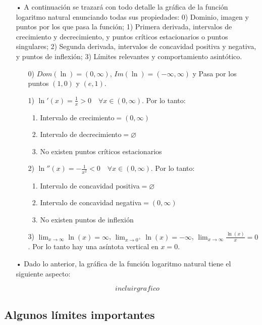 \documentclass[pts12]{article}
\numberwithin{equation}{section}
\newcommand{\Col}{\color{ProcessBlue}}
\begin{document}
\begin{itemize}

\item[\Col •] A continuación se trazará con todo detalle la gráfica de la función logaritmo natural enunciando todas sus propiedades: 0) Dominio, imagen y puntos por los que pasa la función; 1) Primera derivada, intervalos de crecimiento y decrecimiento, y puntos críticos estacionarios o puntos singulares; 2) Segunda derivada, intervalos de concavidad positiva y negativa, y puntos de inflexión; 3) Límites relevantes y comportamiento asintótico. 

\begin{enumerate}
\item[0)] $Dom(\ln)=(0,\infty)$, $Im(\ln)=(-\infty,\infty)$ y Pasa por los puntos $(1,0)$ y $(e,1)$.
\item[1)] $\ln'(x)=\frac{1}{x}>0 \quad \forall x\in (0,\infty)$. Por lo tanto:
\begin{enumerate}
\item Intervalo de crecimiento$=(0,\infty)$
\item Intervalo de decrecimiento$=\varnothing$
\item No existen puntos críticos estacionarios
\end{enumerate} 
\item[2)] $\ln''(x)=-\frac{1}{x^2}<0 \quad \forall x\in (0,\infty)$. Por lo tanto:
\begin{enumerate}
\item Intervalo de concavidad positiva$=\varnothing$
\item Intervalo de concavidad negativa$=(0,\infty)$
\item No existen puntos de inflexión
\end{enumerate}
\item[3)] $\lim_{x\to\infty}\ln(x)=\infty$, $\lim_{x\to 0^+}\ln(x)=-\infty$, $\lim_{x\to\infty}\frac{\ln(x)}{x}=0$. Por lo tanto hay una asíntota vertical en $x=0$.
\end{enumerate}

\item[\Col •] Dado lo anterior, la gráfica de la función logaritmo natural tiene el siguiente aspecto:

$$ incluirgrafico $$

\end{itemize}

\subsection{\Col Algunos límites importantes}
\end{document}
